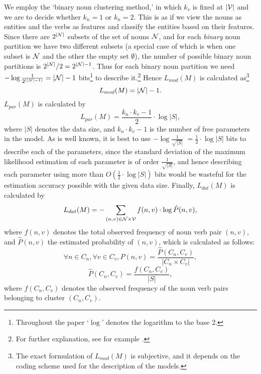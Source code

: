 We employ the `binary noun clustering method,' in which $k_v$ is fixed
at $|{\cal V}|$ and we are to decide whether $k_n=1$ or $k_n=2$. This
is as if we view the nouns as entities and the verbs as features and
classify the entities based on their features. Since there are
$2^{|{\cal N}|}$ subsets of the set of nouns ${\cal N}$, and for each
{\em binary} noun partition we have two different subsets (a special
case of which is when one subset is ${\cal N}$ and the other the empty
set $\emptyset$), the number of possible binary noun partitions is
$2^{|{\cal N}|}/2= 2^{|{\cal N}|-1}$. Thus for each binary noun
partition we need $- \log \frac{1}{2^{(|{\cal N}|-1)}}= |{\cal N}|-1$
bits\footnote{Throughout the paper `$\log$' denotes the logarithm to
  the base 2.} to describe it.\footnote{For further explanation, see
  for example \cite{Quinlan89}.} Hence $L_{mod}(M)$ is calculated
as\footnote{The exact formulation of $L_{mod}(M)$ is subjective, and
  it depends on the coding scheme used for the description of the
  models.}
\begin{equation} L_{mod}(M) = |{\cal N}| - 1. \end{equation}
  $L_{par}(M)$ is calculated by \begin{equation} L_{par}(M) =
  \frac{k_n \cdot k_v - 1}{2} \cdot \log |S|, \end{equation} where
  $|S|$ denotes the data size, and $k_n \cdot k_v - 1$ is the number
  of free parameters in the model. As is well known, it is best to use
  $-\log \frac{1}{\sqrt{|S|}}$ $= \frac{1}{2}\cdot \log |S|$ bits to
  describe each of the parameters, since the standard deviation of the
  maximum likelihood estimation of each parameter is of order
  $\frac{1}{\sqrt{|S|}}$, and hence describing each parameter using
  more than $O(\frac{1}{2} \cdot \log |S|)$ bits would be
  wasteful for the estimation accuracy possible with the given data
  size. Finally, $L_{dat}(M)$ is calculated by
 \begin{equation} L_{dat}(M) = - \sum_{(n,v)\in {\cal N} \times {\cal V}}
 f(n,v) \cdot \log\hat{P}(n,v),\end{equation} where $f(n,v)$ denotes
 the total observed frequency of noun verb pair $(n,v)$, and
 $\hat{P}(n,v)$ the estimated probability of $(n,v)$, which is
 calculated as follows:
 \begin{equation} \forall n \in C_n, \forall v \in C_v,
 \hat{P}(n,v) = \frac{\hat{P}(C_n,C_v)}{|C_n \times C_v|},
 \end{equation}
\begin{equation}
 \hat{P}(C_n,C_v) = \frac{f(C_n,C_v)}{|S|}, \end{equation} where
 $f(C_n,C_v)$ denotes the observed frequency of the noun verb pairs
 belonging to cluster $(C_n,C_v)$.

